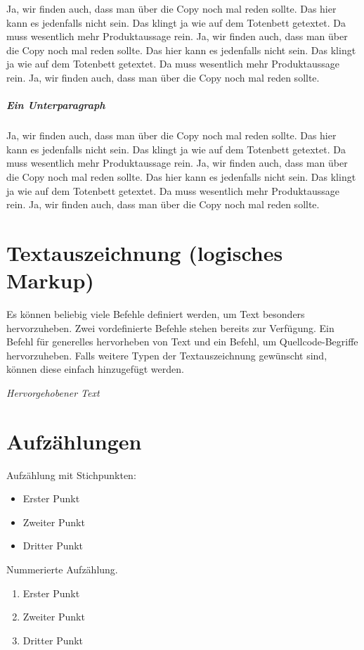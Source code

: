Ja, wir finden auch, dass man über die Copy noch mal reden sollte. Das hier kann es jedenfalls nicht sein. Das klingt ja wie auf dem Totenbett getextet. Da muss wesentlich mehr Produktaussage rein. Ja, wir finden auch, dass man über die Copy noch mal reden sollte. Das hier kann es jedenfalls nicht sein. Das klingt ja wie auf dem Totenbett getextet. Da muss wesentlich mehr Produktaussage rein. Ja, wir finden auch, dass man über die Copy noch mal reden sollte.


\subparagraph{Ein Unterparagraph}

Ja, wir finden auch, dass man über die Copy noch mal reden sollte. Das hier kann es jedenfalls nicht sein. Das klingt ja wie auf dem Totenbett getextet. Da muss wesentlich mehr Produktaussage rein. Ja, wir finden auch, dass man über die Copy noch mal reden sollte. Das hier kann es jedenfalls nicht sein. Das klingt ja wie auf dem Totenbett getextet. Da muss wesentlich mehr Produktaussage rein. Ja, wir finden auch, dass man über die Copy noch mal reden sollte.


\section{Textauszeichnung (logisches Markup)}

Es können beliebig viele Befehle definiert werden, um Text besonders hervorzuheben. Zwei vordefinierte Befehle stehen bereits zur Verfügung. Ein Befehl für generelles hervorheben von Text und ein Befehl, um Quellcode-Begriffe hervorzuheben. Falls weitere Typen der Textauszeichnung gewünscht sind, können diese einfach hinzugefügt werden.

\emph{Hervorgehobener Text}



\section{Aufzählungen}

Aufzählung mit Stichpunkten:

\begin{itemize}
	\item Erster Punkt
	\item Zweiter Punkt
	\item Dritter Punkt
\end{itemize}

Nummerierte Aufzählung.

\begin{enumerate}
	\item Erster Punkt
	\item Zweiter Punkt
	\item Dritter Punkt
\end{enumerate}


